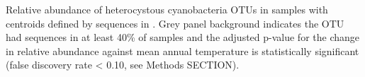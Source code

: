 Relative abundance of heterocystous cyanobacteria OTUs in \citet{Garcia_Pichel_2013} samples with centroids defined by sequences in \citet{Yeager}. Grey panel background indicates the OTU had sequences in at least 40\% of samples and the adjusted p-value for the change in relative abundance against mean annual temperature is statistically significant (false discovery rate < 0.10, see Methods SECTION).